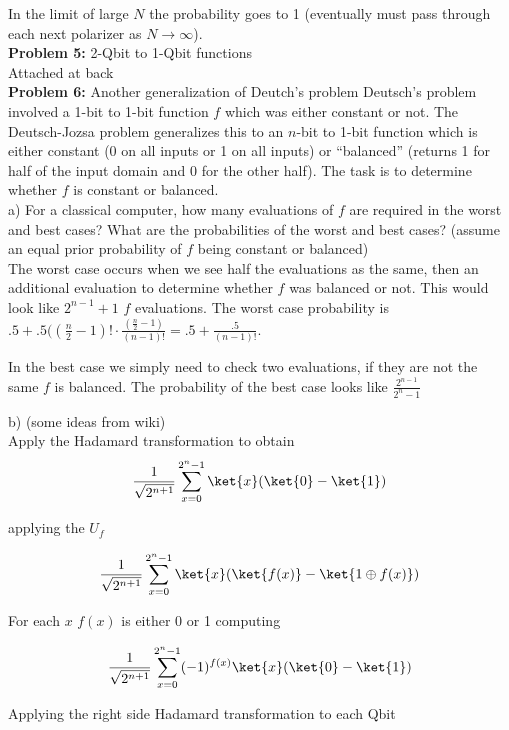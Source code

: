 In the limit of large $N$ the probability goes to 1 (eventually must pass
through each next polarizer as $N\rightarrow\infty$).\\

\textbf{Problem 5:} 2-Qbit to 1-Qbit functions\\

Attached at back\\



\textbf{Problem 6:} Another generalization of Deutch's problem
Deutsch’s problem involved a 1-bit to 1-bit function $f$ which was either
constant or
not. The Deutsch-Jozsa problem generalizes this to an $n$-bit to 1-bit function
which is
either constant (0 on all inputs or 1 on all inputs) or “balanced” (returns 1
for half of the
input domain and 0 for the other half). The task is to determine whether $f$ is constant or
balanced.\\

a) For a classical computer, how many evaluations of $f$ are required in the
worst and
best cases? What are the probabilities of the worst and best cases? (assume an
equal prior
probability of $f$ being constant or balanced)\\

The worst case occurs when we see half the evaluations as the same, then an
additional evaluation to determine whether $f$ was balanced or not. This would
look like $2^{n-1}+1$ $f$ evaluations. The worst case probability is
$.5+.5((\frac{n}{2}-1)!\cdot
\frac{(\frac{n}{2}-1)}{(n-1)!}=.5+\frac{.5}{(n-1)!}$.

In the best case we simply need to check two evaluations, if they are not the
same $f$ is balanced. The probability of the best case looks like
$\frac{2^{n-1}}{2^n-1}$

b) (some ideas from wiki)\\

Apply the Hadamard transformation to obtain
$$\frac{1}{\sqrt{2^{n+1}}}\sum^{2^n-1}_{x=0}\ket{x}(\ket{0}-\ket{1})$$

applying the $U_f$

$$\frac{1}{\sqrt{2^{n+1}}}\sum^{2^n-1}_{x=0}\ket{x}(\ket{f(x)}-\ket{1\oplus
f(x)})$$

For each $x$ $f(x)$ is either 0 or 1 computing

$$\frac{1}{\sqrt{2^{n+1}}}\sum^{2^n-1}_{x=0}(-1)^{f(x)}\ket{x}(\ket{0}-\ket{1})$$

Applying the right side Hadamard transformation to each Qbit

